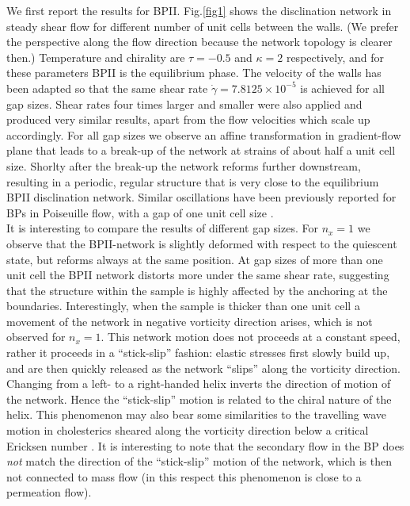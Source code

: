 \documentclass[12pt,twoside]{iopart}
\newcommand{\ex}[1]{\times10^{#1}}
\begin{document}
We first report the results for BPII.
Fig.\ref{fig1} shows the disclination network in steady shear flow for different number of unit cells between the walls.
(We prefer the perspective along the flow direction because the network topology is clearer then.)
Temperature and chirality are $\tau=-0.5$ and $\kappa=2$ respectively, and for these parameters BPII is the equilibrium phase.
The velocity of the walls has been adapted so that the same shear rate $\dot{\gamma}=7.8125\ex{-5}$ is achieved for all gap sizes.
Shear rates four times larger and smaller were also applied and produced very similar results, apart from the flow velocities which scale up accordingly.
For all gap sizes we observe an affine transformation in gradient-flow plane that leads to a break-up of the network at strains of about half a unit cell size.
Shorlty after the break-up the network reforms further downstream, resulting in a periodic, regular structure that is very close to the equilibrium
BPII disclination network. Similar oscillations have been previously reported for
BPs in Poiseuille flow, with a gap of one unit cell size \cite{Dupuis:2005}.\\
It is interesting to compare the results of different gap sizes.
For $n_x=1$ we observe that the BPII-network is slightly deformed with respect to the quiescent state, but reforms always at the same position.
At gap sizes of more than one unit cell the BPII network distorts more under the same shear rate, 
suggesting that the structure within the sample is highly affected by the anchoring at the boundaries.
Interestingly, when the sample is thicker than one unit cell a movement of the network in negative vorticity direction arises, 
which is not observed for $n_x=1$.
This network motion does not proceeds at a constant speed, rather it proceeds in a ``stick-slip'' fashion: elastic stresses first slowly build up, and are then 
quickly released as the network ``slips'' along the vorticity direction.
Changing from a left- to a right-handed helix inverts the direction of motion of the network.
Hence the ``stick-slip'' motion is related to the chiral nature of the helix. This phenomenon may also bear some similarities to
the travelling wave motion in cholesterics sheared along the vorticity direction 
below a critical Ericksen number \cite{Rey:1996a, Rey:1996b}.
It is interesting to note that the secondary flow in the BP
does {\em not} match the direction of the ``stick-slip'' motion of the network, which is then not connected to mass flow
(in this respect this phenomenon is close to a permeation flow).
\end{document}

